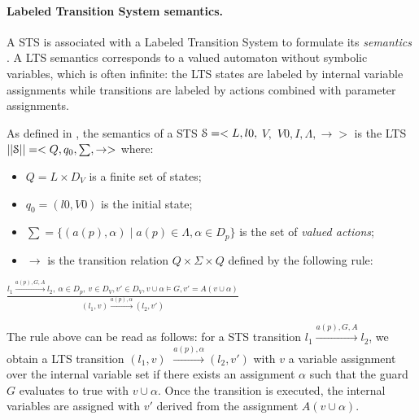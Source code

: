 \paragraph{Labeled Transition System semantics.}
\label{sec:definitions:lts-semantics}

A STS is associated with a Labeled Transition System to formulate
its \emph{semantics} \cite{FTW05}. A LTS semantics corresponds to
a valued automaton without symbolic variables, which is often
infinite: the LTS states are labeled by internal variable
assignments while transitions are labeled by actions combined
with parameter assignments.

\begin{definition}
    As defined in \cite{FTW05}, the semantics of a STS
    $\EuScript{S}=<L,l0,$ $V,$ $V0, I,\Lambda,\rightarrow>$ is
    the LTS $||\EuScript{S}||=<Q,q_0,\sum,\rightarrow>$ where:

	\begin{itemize}

        \item $Q=L \times D_V$ is a finite set of states;

        \item $q_0=(l0,V0)$ is the initial state;

        \item $\sum=\{(a(p),\alpha)  \mid  a(p)\in\Lambda, \alpha
            \in D_p\}$ is the set of \emph{valued actions};

        \item $\rightarrow$ is the transition relation $Q \times
            \Sigma \times Q$ defined by the following rule:\\
	\end{itemize}
    \begin{center}
    {\Large
    $\frac{l_1 \xrightarrow{a(p),G,A}l_2, ~\alpha \in D_p, ~v \in
        D_V, v' \in D_V, v \cup \alpha \models G, v' = A(v
        \cup \alpha)}{(l_1,v) \xrightarrow{a(p),\alpha} (l_2,v') }$
    }
	\end{center}

	\label{def:semantics}
\end{definition}

The rule above can be read as follows: for a STS transition $l_1
\xrightarrow{a(p),G,A}l_2$, we obtain a LTS transition $(l_1,v)$
$\xrightarrow{a(p),\alpha} (l_2,v')$ with $v$ a variable
assignment over the internal variable set if there exists an
assignment $\alpha$ such that the guard $G$ evaluates to true
with $v \cup \alpha$. Once the transition is executed, the
internal variables are assigned with $v'$ derived from the
assignment $A(v \cup \alpha)$.

